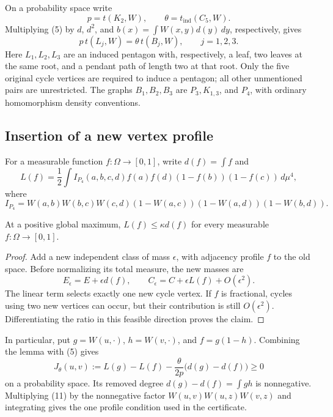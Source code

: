 On a probability space write
\[
 p=t(K_2,W),\qquad\theta=t_{\mathrm{ind}}(C_5,W).
\]
Multiplying (5) by \(d\), \(d^2\), and
\(b(x)=\int W(x,y)d(y)\,dy\), respectively, gives
\begin{equation}
 p\,t(L_j,W)=\theta\,t(B_j,W),\qquad j=1,2,3.\tag{9}
\end{equation}
Here \(L_1,L_2,L_3\) are an induced pentagon with, respectively, a leaf,
two leaves at the same root, and a pendant path of length two at that root.
Only the five original cycle vertices are required to induce a pentagon;
all other unmentioned pairs are unrestricted. The graphs \(B_1,B_2,B_3\)
are \(P_3,K_{1,3}\), and \(P_4\), with ordinary homomorphism density
conventions.

\subsection{Insertion of a new vertex profile}

For a measurable function \(f:\Omega\to[0,1]\), write \(d(f)=\int f\) and
\begin{equation}
 L(f)=\frac12\int I_{P_4}(a,b,c,d)
                 f(a)f(d)(1-f(b))(1-f(c))\,d\mu^4,\tag{10}
\end{equation}
where
\[
 I_{P_4}=W(a,b)W(b,c)W(c,d)
           (1-W(a,c))(1-W(a,d))(1-W(b,d)).
\]

\begin{lemma}\label{lem:profile-insertion}
At a positive global maximum, \(L(f)\le\kappa d(f)\) for every
measurable \(f:\Omega\to[0,1]\).
\end{lemma}
\begin{proof}
Add a new independent class of mass \(\epsilon\), with adjacency profile
\(f\) to the old space. Before normalizing its total measure, the new masses
are
\[
 E_\epsilon=E+\epsilon d(f),\qquad
 C_\epsilon=C+\epsilon L(f)+O(\epsilon^2).
\]
The linear term selects exactly one new cycle vertex. If \(f\) is
fractional, cycles using two new vertices can occur, but their contribution
is still \(O(\epsilon^2)\). Differentiating the ratio in this feasible
direction proves the claim.
\end{proof}

In particular, put \(g=W(u,\cdot)\), \(h=W(v,\cdot)\), and \(f=g(1-h)\).
Combining the lemma with (5) gives
\begin{equation}
 J_\theta(u,v):=L(g)-L(f)
       -\frac{\theta}{2p}\bigl(d(g)-d(f)\bigr)\ge0\tag{11}
\end{equation}
on a probability space. Its removed degree \(d(g)-d(f)=\int gh\) is
nonnegative. Multiplying (11) by the nonnegative factor
\(W(u,v)W(u,z)W(v,z)\) and integrating gives the one profile condition
used in the certificate.


